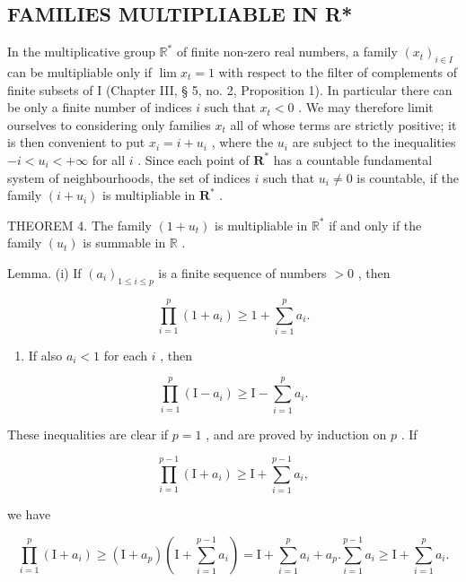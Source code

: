 \subsection{FAMILIES MULTIPLIABLE IN R*}

In the multiplicative group \(\mathbb{R}^*\) of finite non-zero real numbers, a family \((x_{t})_{i\in I}\) can be multipliable only if \(\lim x_{t} = 1\) with respect to the filter of complements of finite subsets of I (Chapter III, § 5, no. 2, Proposition 1). In particular there can be only a finite number of indices \(i\) such that \(x_{t} < 0\) . We may therefore limit ourselves to considering only families \(x_{t}\) all of whose terms are strictly positive; it is then convenient to put \(x_{i} = i + u_{i}\) , where the \(u_{i}\) are subject to the inequalities \(-i < u_{i} < +\infty\) for all \(i\) . Since each point of \(\mathbf{R}^*\) has a countable fundamental system of neighbourhoods, the set of indices \(i\) such that \(u_{i} \neq 0\) is countable, if the family \((i + u_{i})\) is multipliable in \(\mathbf{R}^*\) .

THEOREM 4. The family \((1 + u_{t})\) is multipliable in \(\mathbb{R}^*\) if and only if the family \((u_{t})\) is summable in \(\mathbb{R}\) .

Lemma. (i) If \((a_{i})_{1\leqslant i\leqslant p}\) is a finite sequence of numbers \(>0\) , then

\[
\prod_ {i = 1} ^ {p} \left(1 + a _ {i}\right) \geqslant 1 + \sum_ {i = 1} ^ {p} a _ {i}.\tag{2}
\]

\begin{enumerate}
\def\labelenumi{(\roman{enumi})}
\setcounter{enumi}{1}
\tightlist
\item
  If also \(a_i < 1\) for each \(i\) , then
\end{enumerate}

\[
\prod_ {i = 1} ^ {p} \left(\mathrm{I} - a _ {i}\right) \geqslant \mathrm{I} - \sum_ {i = 1} ^ {p} a _ {i}.\tag{3}
\]

These inequalities are clear if \(p = 1\) , and are proved by induction on \(p\) . If

\[
\prod_ {i = 1} ^ {p - 1} \left(\mathrm{I} + a _ {i}\right) \geqslant \mathrm{I} + \sum_ {i = 1} ^ {p - 1} a _ {i},
\]

we have

\[
\prod_ {i = 1} ^ {p} \left(\mathrm{I} + a _ {i}\right) \geqslant \left(\mathrm{I} + a _ {p}\right) \left(\mathrm{I} + \sum_ {i = 1} ^ {p - 1} a _ {i}\right) = \mathrm{I} + \sum_ {i = 1} ^ {p} a _ {i} + a _ {p}. \sum_ {i = 1} ^ {p - 1} a _ {i} \geqslant \mathrm{I} + \sum_ {i = 1} ^ {p} a _ {i}.
\]


